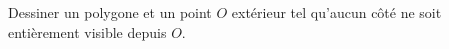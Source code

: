 Dessiner un polygone et un point $O$ extérieur tel qu'aucun côté ne soit entièrement visible depuis $O$.
